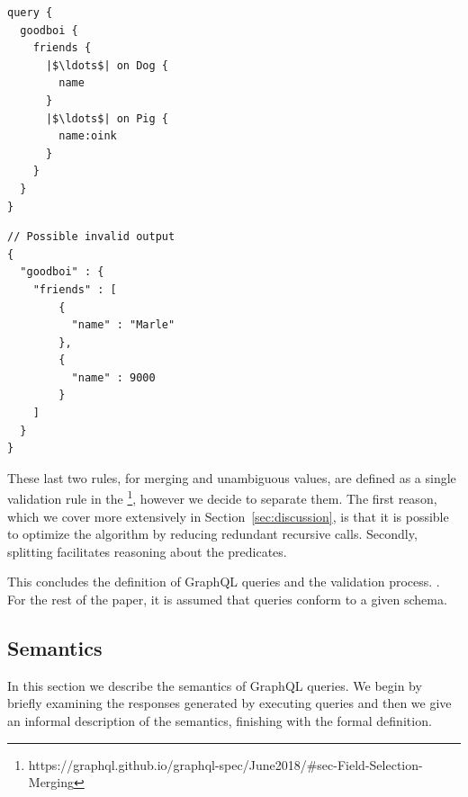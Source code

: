\begin{minipage}[t]{.22\textwidth}
\begin{verbatim}
query {
  goodboi {
    friends {
      |$\ldots$| on Dog {
        name
      }
      |$\ldots$| on Pig {
        name:oink
      }
    }
  }
}
\end{verbatim}
\end{minipage}%
\begin{minipage}[t]{.22\textwidth}
\begin{verbatim}
// Possible invalid output
{
  "goodboi" : {
    "friends" : [
        {
          "name" : "Marle"
        },
        {
          "name" : 9000
        }
    ]
  }
}
\end{verbatim}
\end{minipage}



				
These last two rules, for merging and unambiguous values, are defined as a single validation rule in the \spec{}\footnote{https://graphql.github.io/graphql-spec/June2018/\#sec-Field-Selection-Merging}, however we decide to separate them. The first reason, which we cover more extensively in Section~\ref{sec:discussion}, is that it is possible to optimize the algorithm by reducing redundant recursive calls. Secondly, splitting facilitates reasoning about the predicates.



This concludes the definition of GraphQL queries and the validation process. . For the rest of the paper, it is assumed that queries conform to a given schema. 

\subsection{Semantics}\label{subsec:semantics}

In this section we describe the semantics of GraphQL queries. We begin by briefly examining the responses generated by executing queries and then we give an informal description of the semantics, finishing with the formal definition. %

